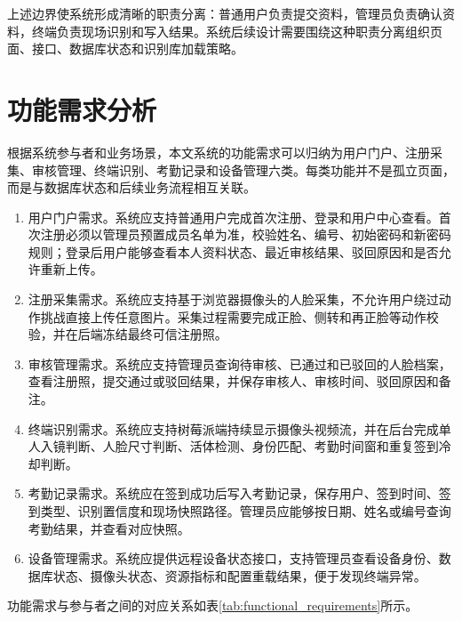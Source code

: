 上述边界使系统形成清晰的职责分离：普通用户负责提交资料，管理员负责确认资料，终端负责现场识别和写入结果。系统后续设计需要围绕这种职责分离组织页面、接口、数据库状态和识别库加载策略。

\section{功能需求分析}

根据系统参与者和业务场景，本文系统的功能需求可以归纳为用户门户、注册采集、审核管理、终端识别、考勤记录和设备管理六类。每类功能并不是孤立页面，而是与数据库状态和后续业务流程相互关联。

\begin{enumerate}
    \item 用户门户需求。系统应支持普通用户完成首次注册、登录和用户中心查看。首次注册必须以管理员预置成员名单为准，校验姓名、编号、初始密码和新密码规则；登录后用户能够查看本人资料状态、最近审核结果、驳回原因和是否允许重新上传。
    \item 注册采集需求。系统应支持基于浏览器摄像头的人脸采集，不允许用户绕过动作挑战直接上传任意图片。采集过程需要完成正脸、侧转和再正脸等动作校验，并在后端冻结最终可信注册照。
    \item 审核管理需求。系统应支持管理员查询待审核、已通过和已驳回的人脸档案，查看注册照，提交通过或驳回结果，并保存审核人、审核时间、驳回原因和备注。
    \item 终端识别需求。系统应支持树莓派端持续显示摄像头视频流，并在后台完成单人入镜判断、人脸尺寸判断、活体检测、身份匹配、考勤时间窗和重复签到冷却判断。
    \item 考勤记录需求。系统应在签到成功后写入考勤记录，保存用户、签到时间、签到类型、识别置信度和现场快照路径。管理员应能够按日期、姓名或编号查询考勤结果，并查看对应快照。
    \item 设备管理需求。系统应提供远程设备状态接口，支持管理员查看设备身份、数据库状态、摄像头状态、资源指标和配置重载结果，便于发现终端异常。
\end{enumerate}

功能需求与参与者之间的对应关系如表\ref{tab:functional_requirements}所示。


